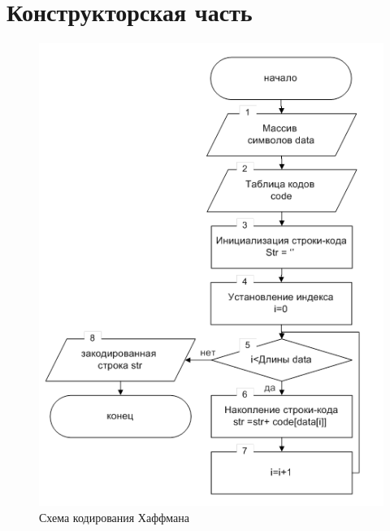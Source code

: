 \section{Конструкторская часть}

\begin{figure}[!htb]\centering
	\includegraphics[width=0.6\linewidth]{../img/rsa.png}
	\caption{Схема кодирования Хаффмана}
	\label{img:haff}
\end{figure}
